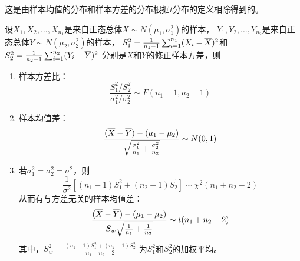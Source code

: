 \begin{remark}
  这是由样本均值的分布和样本方差的分布根据$t$分布的定义相除得到的。
\end{remark}

\begin{theorem}
  设$X_1,X_2,\dots,X_{n_1}$是来自正态总体$X\sim N(\mu_1,\sigma_1^2)$的样本，
  $Y_1,Y_2,\dots,Y_{n_2}$是来自正态总体$Y\sim N(\mu_2,\sigma_2^2)$的样本，
  $S_1^2=\frac{1}{n_1-1}\sum_{i=1}^{n_1}(X_i-\overline{X})^2$和
  $S_2^2=\frac{1}{n_2-1}\sum_{i=1}^{n_2}(Y_i-\overline{Y})^2$
  分别是$X$和$Y$的修正样本方差，则
  \begin{enumerate}
    \item 样本方差比：
    \begin{displaymath}
      \frac{S_1^2/S_2^2}{\sigma_1^2/\sigma_2^2}\sim F(n_1-1,n_2-1)
    \end{displaymath}
    \item 样本均值差：
    \begin{displaymath}
      \frac{(\overline{X}-\overline{Y})-(\mu_1-\mu_2)}
      {\sqrt{\frac{\sigma_1^2}{n_1}+\frac{\sigma_2^2}{n_2}}}
      \sim N(0,1)
    \end{displaymath}
    \item 若$\sigma_1^2=\sigma_2^2=\sigma^2$，则
    \begin{displaymath}
      \frac{1}{\sigma^2}\left[(n_1-1)S_1^2+(n_2-1)S_2^1\right]
      \sim \chi^2(n_1+n_2-2)
    \end{displaymath}
    从而有与方差无关的样本均值差：
    \begin{displaymath}
      \frac{(\overline{X}-\overline{Y})-(\mu_1-\mu_2)}
      {S_w\sqrt{\frac{1}{n_1}+\frac{1}{n_2}}}
      \sim t(n_1+n_2-2)
    \end{displaymath}
    其中，$S_w^2=\frac{(n_1-1)S_1^2+(n_2-1)S_2^2}{n_1+n_2-2}$
    为$S_1^2$和$S_2^2$的加权平均。
  \end{enumerate}
\end{theorem}
